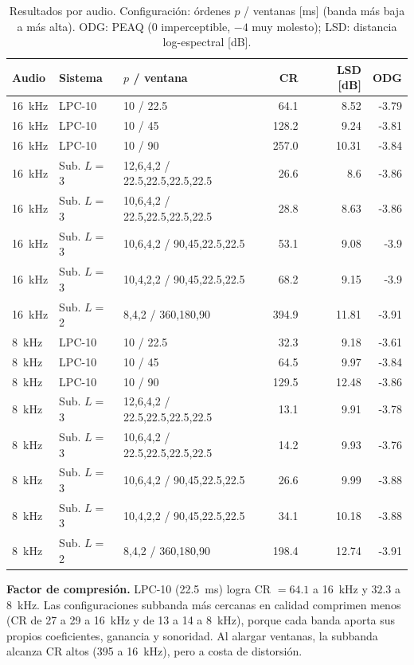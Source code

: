 \documentclass[10pt,twocolumn]{article}
\begin{document}
\begin{table}[t]\centering\footnotesize
\caption{Resultados por audio. Configuraci\'on: \'ordenes $p$ / ventanas [ms] (banda m\'as baja a m\'as alta). ODG: PEAQ (0 imperceptible, $-4$ muy molesto); LSD: distancia log-espectral [dB].}\label{tab:cfg}
\begin{tabular}{lllrrr}\toprule
Audio & Sistema & $p$ / ventana & CR & LSD [dB] & ODG\\\midrule
16~kHz & LPC-10 & 10 / 22.5 & 64.1 & 8.52 & -3.79\\
16~kHz & LPC-10 & 10 / 45 & 128.2 & 9.24 & -3.81\\
16~kHz & LPC-10 & 10 / 90 & 257.0 & 10.31 & -3.84\\
16~kHz & Sub. $L{=}$3 & 12,6,4,2 / 22.5,22.5,22.5,22.5 & 26.6 & 8.6 & -3.86\\
16~kHz & Sub. $L{=}$3 & 10,6,4,2 / 22.5,22.5,22.5,22.5 & 28.8 & 8.63 & -3.86\\
16~kHz & Sub. $L{=}$3 & 10,6,4,2 / 90,45,22.5,22.5 & 53.1 & 9.08 & -3.9\\
16~kHz & Sub. $L{=}$3 & 10,4,2,2 / 90,45,22.5,22.5 & 68.2 & 9.15 & -3.9\\
16~kHz & Sub. $L{=}$2 & 8,4,2 / 360,180,90 & 394.9 & 11.81 & -3.91\\
\midrule
8~kHz & LPC-10 & 10 / 22.5 & 32.3 & 9.18 & -3.61\\
8~kHz & LPC-10 & 10 / 45 & 64.5 & 9.97 & -3.84\\
8~kHz & LPC-10 & 10 / 90 & 129.5 & 12.48 & -3.86\\
8~kHz & Sub. $L{=}$3 & 12,6,4,2 / 22.5,22.5,22.5,22.5 & 13.1 & 9.91 & -3.78\\
8~kHz & Sub. $L{=}$3 & 10,6,4,2 / 22.5,22.5,22.5,22.5 & 14.2 & 9.93 & -3.76\\
8~kHz & Sub. $L{=}$3 & 10,6,4,2 / 90,45,22.5,22.5 & 26.6 & 9.99 & -3.88\\
8~kHz & Sub. $L{=}$3 & 10,4,2,2 / 90,45,22.5,22.5 & 34.1 & 10.18 & -3.88\\
8~kHz & Sub. $L{=}$2 & 8,4,2 / 360,180,90 & 198.4 & 12.74 & -3.91\\
\bottomrule\end{tabular}
\end{table}

\textbf{Factor de compresi\'on.} LPC-10 (22.5~ms) logra CR $=64.1$ a 16~kHz y $32.3$ a 8~kHz. Las configuraciones subbanda m\'as cercanas en calidad comprimen menos (CR de 27 a 29 a 16~kHz y de 13 a 14 a 8~kHz), porque cada banda aporta sus propios coeficientes, ganancia y sonoridad. Al alargar ventanas, la subbanda alcanza CR altos (395 a 16~kHz), pero a costa de distorsi\'on.
\end{document}

